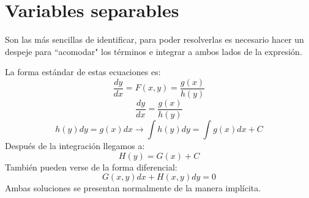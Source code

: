 \documentclass[
	12pt, %
	fleqn, %
	a4paper, %
]{LegrandOrangeBook}
\begin{document}
\section{Variables separables}
Son las más sencillas de identificar, para poder resolverlas es necesario hacer un despeje para ``acomodar" los términos e integrar a ambos lados de la expresión.
\begin{definition}
La forma estándar de estas ecuaciones es:\\
\begin{displaymath}
\frac{dy}{dx}=F(x,y)=\frac{g(x)}{h(y)}
\end{displaymath}
\begin{displaymath}
\frac{dy}{dx}=\frac{g(x)}{h(y)}
\end{displaymath}
\begin{displaymath}
h(y)dy=g(x)dx \rightarrow \int h(y)dy=\int g(x)dx + C
\end{displaymath}
Después de la integración llegamos a:
\begin{displaymath}
H(y)=G(x)+C
\end{displaymath}
También pueden verse de la forma diferencial:\\
\begin{equation}\label{eq:edprimerorden}
G(x,y)dx+H(x,y)dy=0
\end{equation}
Ambas soluciones se presentan normalmente de la manera implícita.
\end{definition}
\end{document}
